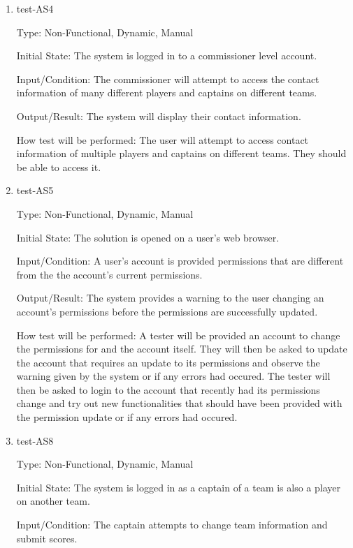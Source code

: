 \documentclass[12pt, titlepage]{article}
\begin{document}
\begin{enumerate}
  \item{test-AS4\\}
  
  Type: Non-Functional, Dynamic, Manual
            
  Initial State: The system is logged in to a commissioner level account.
            
  Input/Condition: The commissioner will attempt to access the contact
  information of many different players and captains on different teams.
            
  Output/Result: The system will display their contact information.
            
  How test will be performed: The user will attempt to access contact
  information of multiple players and captains on different teams. They should
  be able to access it.

  \item{test-AS5\\}
  
  Type: Non-Functional, Dynamic, Manual
            
  Initial State: The solution is opened on a user's web browser.
            
  Input/Condition: A user's account is provided permissions that are different from the
  the account's current permissions.
            
  Output/Result: The system provides a warning to the user changing an account's
  permissions before the permissions are successfully updated.
            
  How test will be performed: A tester will be provided an account to change the
  permissions for and the account itself. They will then be asked to update the account
  that requires an update to its permissions and observe the warning given by the system
  or if any errors had occured. The tester will then be asked to login to the account
  that recently had its permissions change and try out new functionalities that should
  have been provided with the permission update or if any errors had occured.

  \item{test-AS8\\}
  
  Type: Non-Functional, Dynamic, Manual
            
  Initial State: The system is logged in as a captain of a team is also a
  player on another team.
            
  Input/Condition: The captain attempts to change team information and submit
  scores.
            

\end{enumerate}
\end{document}
